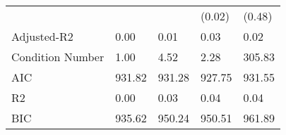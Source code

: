 \begin{table}
\begin{center}
\begin{tabular}{lllll}
                                               &        &         & (0.02)   & (0.48)   \\
Adjusted-R2                                    & 0.00   & 0.01    & 0.03     & 0.02     \\
Condition Number                               & 1.00   & 4.52    & 2.28     & 305.83   \\
AIC                                            & 931.82 & 931.28  & 927.75   & 931.55   \\
R2                                             & 0.00   & 0.03    & 0.04     & 0.04     \\
BIC                                            & 935.62 & 950.24  & 950.51   & 961.89   \\
\hline
\end{tabular}
\end{center}
\end{table}
